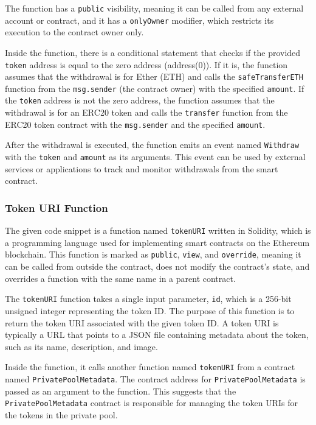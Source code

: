 The function has a \texttt{public} visibility, meaning it can be called
from any external account or contract, and it has a \texttt{onlyOwner}
modifier, which restricts its execution to the contract owner only.

Inside the function, there is a conditional statement that checks if the
provided \texttt{token} address is equal to the zero address
(address(0)). If it is, the function assumes that the withdrawal is for
Ether (ETH) and calls the \texttt{safeTransferETH} function from the
\texttt{msg.sender} (the contract owner) with the specified
\texttt{amount}. If the \texttt{token} address is not the zero address,
the function assumes that the withdrawal is for an ERC20 token and calls
the \texttt{transfer} function from the ERC20 token contract with the
\texttt{msg.sender} and the specified \texttt{amount}.

After the withdrawal is executed, the function emits an event named
\texttt{Withdraw} with the \texttt{token} and \texttt{amount} as its
arguments. This event can be used by external services or applications
to track and monitor withdrawals from the smart contract.

\hypertarget{token-uri-function}{%
\subsubsection{Token URI Function}\label{token-uri-function}}

The given code snippet is a function named \texttt{tokenURI} written in
Solidity, which is a programming language used for implementing smart
contracts on the Ethereum blockchain. This function is marked as
\texttt{public}, \texttt{view}, and \texttt{override}, meaning it can be
called from outside the contract, does not modify the contract's state,
and overrides a function with the same name in a parent contract.

The \texttt{tokenURI} function takes a single input parameter,
\texttt{id}, which is a 256-bit unsigned integer representing the token
ID. The purpose of this function is to return the token URI associated
with the given token ID. A token URI is typically a URL that points to a
JSON file containing metadata about the token, such as its name,
description, and image.

Inside the function, it calls another function named \texttt{tokenURI}
from a contract named \texttt{PrivatePoolMetadata}. The contract address
for \texttt{PrivatePoolMetadata} is passed as an argument to the
function. This suggests that the \texttt{PrivatePoolMetadata} contract
is responsible for managing the token URIs for the tokens in the private
pool.

